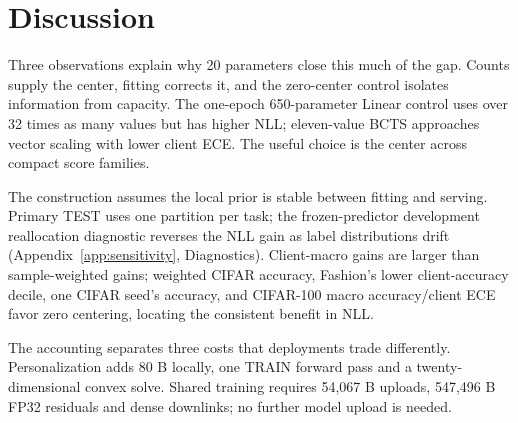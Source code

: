 \section{Discussion}
Three observations explain why 20 parameters close this much of the gap. Counts supply the center, fitting corrects it, and the zero-center control isolates information from capacity. The one-epoch 650-parameter Linear control uses over 32 times as many values but has higher NLL; eleven-value BCTS approaches vector scaling with lower client ECE. The useful choice is the center across compact score families.

The construction assumes the local prior is stable between fitting and serving. Primary TEST uses one partition per task; the frozen-predictor development reallocation diagnostic reverses the NLL gain as label distributions drift (Appendix~\ref{app:sensitivity}, Diagnostics). Client-macro gains are larger than sample-weighted gains; weighted CIFAR accuracy, Fashion's lower client-accuracy decile, one CIFAR seed's accuracy, and CIFAR-100 macro accuracy/client ECE favor zero centering, locating the consistent benefit in NLL.

The accounting separates three costs that deployments trade differently. Personalization adds 80 B locally, one TRAIN forward pass and a twenty-dimensional convex solve. Shared training requires 54,067 B uploads, 547,496 B FP32 residuals and dense downlinks; no further model upload is needed.